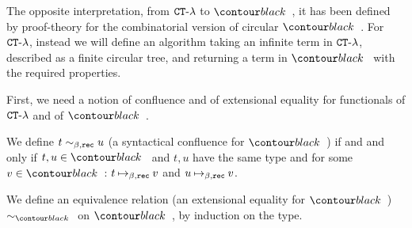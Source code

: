 

The opposite interpretation, from ${ {\tt CT} \mbox{-} \lambda}$ to $\systemT$, it has been defined by proof-theory for the
combinatorial version of circular $\systemT$. For ${ {\tt CT} \mbox{-} \lambda}$, instead we will define an algorithm
taking an infinite term in  ${ {\tt CT} \mbox{-} \lambda}$, described as a finite circular tree, 
and returning a term in $\systemT$ with the required properties. 

First, we need a notion of confluence and of extensional equality 
for  functionals of ${ {\tt CT} \mbox{-} \lambda}$ and of $\systemT$.

We define $t \sim_{\beta,{\tt rec}} u$ (a syntactical confluence for $\systemT$) 
if and and only if $t, u \in \systemT$ and $t,u$ have the same type
and for some $v \in \systemT$: $t \mathbin{\mapsto}_{\beta,{\tt rec}} v$ and $u \mathbin{\mapsto}_{\beta,{\tt rec}} v$.

We define an equivalence relation (an extensional equality for $\systemT$) 
$\sim_{\systemT}$ on $\systemT$, by induction on the type. 



